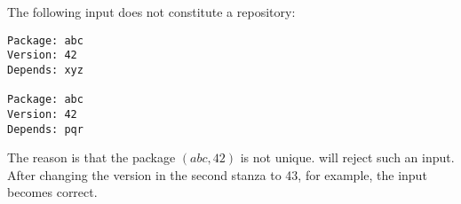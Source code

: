 \begin{example} The following input does not constitute a repository:
\begin{verbatim}
Package: abc
Version: 42
Depends: xyz

Package: abc
Version: 42
Depends: pqr
\end{verbatim}
The reason is that the package $(abc,42)$ is not unique. \debcheck{}
will reject such an input. After changing the version in the second
stanza to 43, for example, the input becomes correct.
\end{example}


